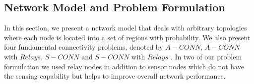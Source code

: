 \documentclass[12pt]{article}
\begin{document}

\subsection{Network Model and Problem Formulation}
In this section, we present a network model that deals with arbitrary topologies where each node is located into a set of regions with probability. We also present four fundamental connectivity problems, denoted by $A-CONN$, $A-CONN$ with $Relays$, $S-CONN$ and $S-CONN$ with $Relays$ . In two of our problem formulation we used relay nodes in addition to sensor nodes which do not have the sensing capability but helps to improve overall network performance.\\ 
\end{document}
